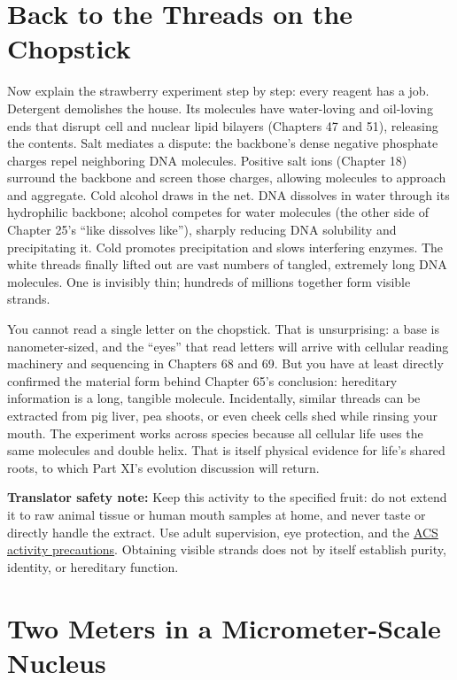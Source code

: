 \section{Back to the Threads on the Chopstick}

Now explain the strawberry experiment step by step: every reagent has a job. Detergent demolishes the house. Its molecules have water-loving and oil-loving ends that disrupt cell and nuclear lipid bilayers (Chapters 47 and 51), releasing the contents. Salt mediates a dispute: the backbone's dense negative phosphate charges repel neighboring DNA molecules. Positive salt ions (Chapter 18) surround the backbone and screen those charges, allowing molecules to approach and aggregate. Cold alcohol draws in the net. DNA dissolves in water through its hydrophilic backbone; alcohol competes for water molecules (the other side of Chapter 25's ``like dissolves like''), sharply reducing DNA solubility and precipitating it. Cold promotes precipitation and slows interfering enzymes. The white threads finally lifted out are vast numbers of tangled, extremely long DNA molecules. One is invisibly thin; hundreds of millions together form visible strands.

You cannot read a single letter on the chopstick. That is unsurprising: a base is nanometer-sized, and the ``eyes'' that read letters will arrive with cellular reading machinery and sequencing in Chapters 68 and 69. But you have at least directly confirmed the material form behind Chapter 65's conclusion: hereditary information is a long, tangible molecule. Incidentally, similar threads can be extracted from pig liver, pea shoots, or even cheek cells shed while rinsing your mouth. The experiment works across species because all cellular life uses the same molecules and double helix. That is itself physical evidence for life's shared roots, to which Part XI's evolution discussion will return.

\textbf{Translator safety note:} Keep this activity to the specified fruit: do not extend it to raw animal tissue or human mouth samples at home, and never taste or directly handle the extract. Use adult supervision, eye protection, and the \href{https://www.acs.org/education/celebrating-chemistry-editions/2024-ccew/science-safety-tips.html}{ACS activity precautions}. Obtaining visible strands does not by itself establish purity, identity, or hereditary function.

\section{Two Meters in a Micrometer-Scale Nucleus}

